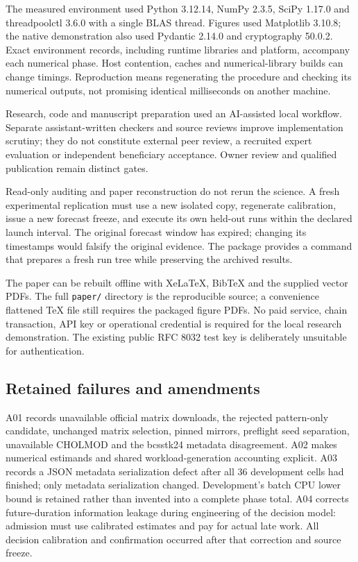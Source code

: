 The measured environment used Python 3.12.14, NumPy 2.3.5, SciPy 1.17.0 and threadpoolctl 3.6.0 with a single BLAS thread. Figures used Matplotlib 3.10.8; the native demonstration also used Pydantic 2.14.0 and cryptography 50.0.2. Exact environment records, including runtime libraries and platform, accompany each numerical phase. Host contention, caches and numerical-library builds can change timings. Reproduction means regenerating the procedure and checking its numerical outputs, not promising identical milliseconds on another machine.

Research, code and manuscript preparation used an AI-assisted local workflow. Separate assistant-written checkers and source reviews improve implementation scrutiny; they do not constitute external peer review, a recruited expert evaluation or independent beneficiary acceptance. Owner review and qualified publication remain distinct gates.

Read-only auditing and paper reconstruction do not rerun the science. A fresh experimental replication must use a new isolated copy, regenerate calibration, issue a new forecast freeze, and execute its own held-out runs within the declared launch interval. The original forecast window has expired; changing its timestamps would falsify the original evidence. The package provides a command that prepares a fresh run tree while preserving the archived results.

The paper can be rebuilt offline with XeLaTeX, BibTeX and the supplied vector PDFs. The full \texttt{paper/} directory is the reproducible source; a convenience flattened TeX file still requires the packaged figure PDFs. No paid service, chain transaction, API key or operational credential is required for the local research demonstration. The existing public RFC 8032 test key is deliberately unsuitable for authentication.

\subsection{Retained failures and amendments}
A01 records unavailable official matrix downloads, the rejected pattern-only candidate, unchanged matrix selection, pinned mirrors, preflight seed separation, unavailable CHOLMOD and the bcsstk24 metadata disagreement. A02 makes numerical estimands and shared workload-generation accounting explicit. A03 records a JSON metadata serialization defect after all 36 development cells had finished; only metadata serialization changed. Development's batch CPU lower bound is retained rather than invented into a complete phase total. A04 corrects future-duration information leakage during engineering of the decision model: admission must use calibrated estimates and pay for actual late work. All decision calibration and confirmation occurred after that correction and source freeze.

